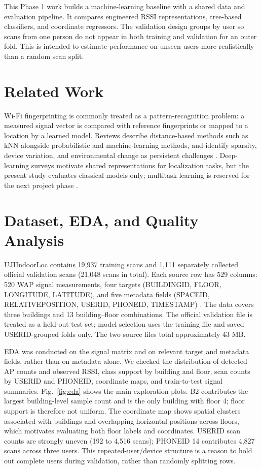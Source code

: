 \documentclass[conference]{IEEEtran}
\begin{document}
This Phase 1 work builds a machine-learning baseline with a shared data and evaluation pipeline. It compares engineered RSSI representations, tree-based classifiers, and coordinate regressors. The validation design groups by user so scans from one person do not appear in both training and validation for an outer fold. This is intended to estimate performance on unseen users more realistically than a random scan split.

\section{Related Work}
Wi-Fi fingerprinting is commonly treated as a pattern-recognition problem: a measured signal vector is compared with reference fingerprints or mapped to a location by a learned model. Reviews describe distance-based methods such as kNN alongside probabilistic and machine-learning methods, and identify sparsity, device variation, and environmental change as persistent challenges \cite{xia2017,liu2020,shang2022}. Deep-learning surveys motivate shared representations for localization tasks, but the present study evaluates classical models only; multitask learning is reserved for the next project phase \cite{feng2022}.

\section{Dataset, EDA, and Quality Analysis}
UJIIndoorLoc contains 19,937 training scans and 1,111 separately collected official validation scans (21,048 scans in total). Each source row has 529 columns: 520 WAP signal measurements, four targets (BUILDINGID, FLOOR, LONGITUDE, LATITUDE), and five metadata fields (SPACEID, RELATIVEPOSITION, USERID, PHONEID, TIMESTAMP) \cite{uci}. The data covers three buildings and 13 building--floor combinations. The official validation file is treated as a held-out test set; model selection uses the training file and saved USERID-grouped folds only. The two source files total approximately 43 MB.

EDA was conducted on the signal matrix and on relevant target and metadata fields, rather than on metadata alone. We checked the distribution of detected AP counts and observed RSSI, class support by building and floor, scan counts by USERID and PHONEID, coordinate maps, and train-to-test signal summaries. Fig.~\ref{fig:eda} shows the main exploration plots. B2 contributes the largest building-level sample count and is the only building with floor 4; floor support is therefore not uniform. The coordinate map shows spatial clusters associated with buildings and overlapping horizontal positions across floors, which motivates evaluating both floor labels and coordinates. USERID scan counts are strongly uneven (192 to 4,516 scans); PHONEID 14 contributes 4,827 scans across three users. This repeated-user/device structure is a reason to hold out complete users during validation, rather than randomly splitting rows.
\end{document}
